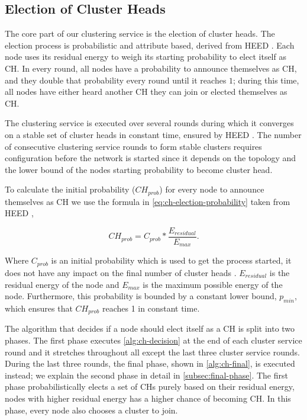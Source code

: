 \subsection{Election of Cluster Heads}
The core part of our clustering service is the election of cluster heads. The election process is probabilistic and attribute based, derived from HEED \cite{Younis2004-HEED}. Each node uses its residual energy to weigh its starting probability to elect itself as CH. In every round, all nodes have a probability to announce themselves as CH, and they double that probability every round until it reaches $1$; during this time, all nodes have either heard another CH they can join or elected themselves as CH.

The clustering service is executed over several rounds during which it converges on a stable set of cluster heads in constant time, ensured by HEED \cite{Younis2004-HEED}. The number of consecutive clustering service rounds to form stable clusters requires configuration before the network is started since it depends on the topology and the lower bound of the nodes starting probability to become cluster head.

To calculate the initial probability ($CH_{prob}$) for every node to announce themselves as CH we use the formula in \cref{eq:ch-election-probability} taken from HEED \cite{Younis2004-HEED},

\begin{equation}
    CH_{prob} = C_{prob} * \frac{E_{residual}}{E_{max}}.
    \label{eq:ch-election-probability}
\end{equation}

Where $C_{prob}$ is an initial probability which is used to get the process started, it does not have any impact on the final number of cluster heads \cite{Younis2004-HEED}. $E_{residual}$ is the residual energy of the node and $E_{max}$ is the maximum possible energy of the node. Furthermore, this probability is bounded by a constant lower bound, $p_{min}$, which ensures that $CH_{prob}$ reaches 1 in constant time.

The algorithm that decides if a node should elect itself as a CH is split into two phases. The first phase executes \cref{alg:ch-decision} at the end of each cluster service round and it stretches throughout all except the last three cluster service rounds. During the last three rounds, the final phase, shown in \cref{alg:ch-final}, is executed instead; we explain the second phase in detail in \cref{subsec:final-phase}. The first phase probabilistically elects a set of CHs purely based on their residual energy, nodes with higher residual energy has a higher chance of becoming CH. In this phase, every node also chooses a cluster to join.

